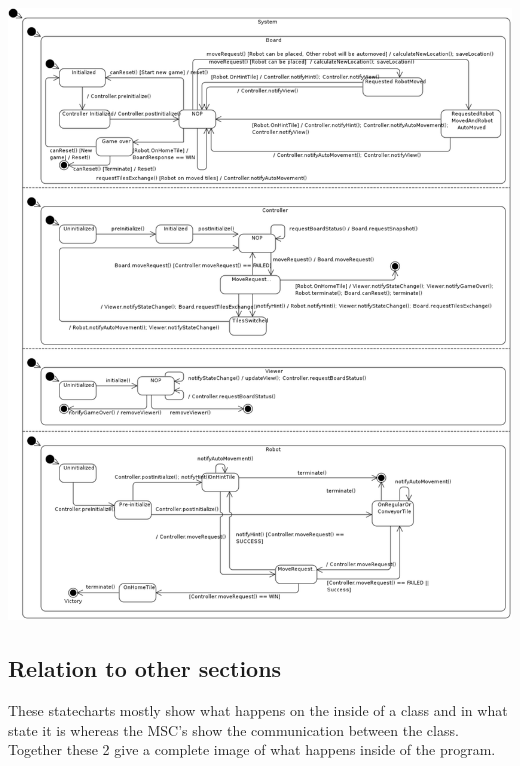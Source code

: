 	\includegraphics[width=\linewidth]{statecharts/system.pdf}

\subsection{Relation to other sections}
    These statecharts mostly show what happens on the inside of a class and in what state it is whereas the MSC's show the communication between the class. Together these 2 give a complete image of what happens inside of the program.
	
